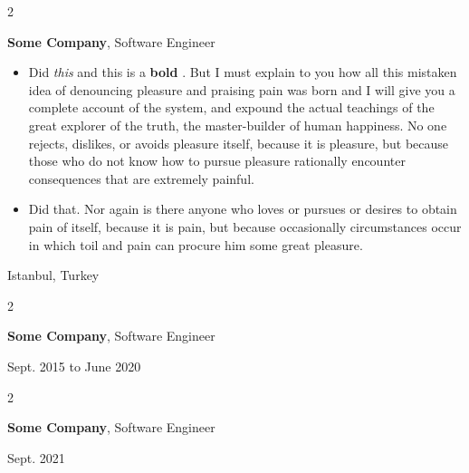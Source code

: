 \documentclass[10pt, letterpaper]{article}
\newenvironment{highlights}{
    \begin{itemize}[
        topsep=0.10 cm,
        parsep=0.10 cm,
        partopsep=0pt,
        itemsep=0pt,
        leftmargin=0.4 cm + 10pt
    ]
}{
    \end{itemize}
} %
\newenvironment{twocolentry}[2][]{
    \onecolentry
    \def\secondColumn{#2}
    \setcolumnwidth{\fill, 4.5 cm}
    \begin{paracol}{2}
}{
    \switchcolumn \raggedleft \secondColumn
    \end{paracol}
    \endonecolentry
} %
\let\hrefWithoutArrow\href
\renewcommand{\href}[2]{\hrefWithoutArrow{#1}{\mbox{\ifthenelse{\equal{#2}{}}{ }{#2 }\raisebox{.15ex}{\footnotesize \faExternalLink*}}}}
\begin{document}
        \vspace{0.2 cm}

        \begin{twocolentry}{
            Istanbul, Turkey
        }
            \textbf{Some \textnormal{Company}}, Software Engineer
            \begin{highlights}
                \item Did \textit{this} and this is a \textbf{bold} \href{https://example.com}{link}. But I must explain to you how all this mistaken idea of denouncing pleasure and praising pain was born and I will give you a complete account of the system, and expound the actual teachings of the great explorer of the truth, the master-builder of human happiness. No one rejects, dislikes, or avoids pleasure itself, because it is pleasure, but because those who do not know how to pursue pleasure rationally encounter consequences that are extremely painful.
                \item Did that. Nor again is there anyone who loves or pursues or desires to obtain pain of itself, because it is pain, but because occasionally circumstances occur in which toil and pain can procure him some great pleasure.
            \end{highlights}
        \end{twocolentry}


        \vspace{0.2 cm}

        \begin{twocolentry}{
            Sept. 2015 to June 2020
        }
            \textbf{Some \textnormal{Company}}, Software Engineer
        \end{twocolentry}


        \vspace{0.2 cm}

        \begin{twocolentry}{
            Sept. 2021
        }
            \textbf{Some \textnormal{Company}}, Software Engineer
        \end{twocolentry}


        \vspace{0.2 cm}
\end{document}
